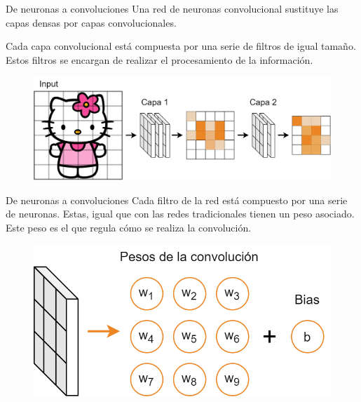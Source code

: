 \begin{frame}{De neuronas a convoluciones}
Una \alert{red de neuronas} convolucional sustituye las capas \alert{densas} por capas \alert{convolucionales}.

Cada capa convolucional está compuesta por una \alert{serie} de \alert{filtros} de igual tamaño. Estos filtros se encargan de realizar el procesamiento de la información.

\begin{figure}
    \centering
    \includegraphics[width=\textwidth]{Slides/figures/Tema 3/CNN_Net.png}
\end{figure}
\end{frame}

\begin{frame}{De neuronas a convoluciones}
Cada \alert{filtro} de la red está compuesto por una serie de \alert{neuronas}. Estas, igual que con las redes \alert{tradicionales} tienen un \alert{peso} asociado. Este peso es el que regula cómo se realiza la \alert{convolución}.

\begin{figure}
    \centering
    \includegraphics[width=\textwidth]{Slides/figures/Tema 3/ConvNeuron.png}
\end{figure}
\end{frame}

